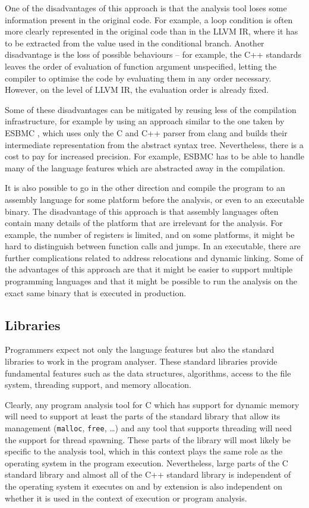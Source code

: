 One of the disadvantages of this approach is that the analysis tool loses some
information present in the original code.
For example, a loop condition is often more clearly represented in the original
code than in the LLVM IR, where it has to be extracted from the value used in
the conditional branch.
Another disadvantage is the loss of possible behaviours -- for example, the C++ standards leaves the order of evaluation of function argument unspecified, letting the compiler to optimise the code by evaluating them in any order necessary.
However, on the level of LLVM IR, the evaluation order is already fixed.

Some of these disadvantages can be mitigated by reusing less of the compilation
infrastructure, for example by using an approach similar to the one taken by
ESBMC , which uses only the C and C++ parser from clang and
builds their intermediate representation from the abstract syntax tree.
Nevertheless, there is a cost to pay for increased precision.
For example, ESBMC has to be able to handle many of the language features which are abstracted away in the compilation.

It is also possible to go in the other direction and compile the program to an assembly language for some platform before the analysis, or even to an executable binary.
The disadvantage of this approach is that assembly languages often contain many details of the platform that are irrelevant for the analysis.
For example, the number of registers is limited, and on some platforms, it might be hard to distinguish between function calls and jumps.
In an executable, there are further complications related to address relocations and dynamic linking.
Some of the advantages of this approach are that it might be easier to support multiple programming languages and that it might be possible to run the analysis on the exact same binary that is executed in production.

\subsection{Libraries}

Programmers expect not only the language features but also the standard
libraries to work in the program analyser.
These standard libraries provide fundamental features such as the data structures, algorithms, access to the file system, threading support, and memory allocation.

Clearly, any program analysis tool for C which has support for dynamic memory will need to support at least the parts of the standard library that allow its management (\texttt{malloc}, \texttt{free}, …) and any tool that supports threading will need the support for thread spawning.
These parts of the library will most likely be specific to the analysis tool,
which in this context plays the same role as the operating system in the
program execution.
Nevertheless, large parts of the C standard library and almost all of the C++
standard library is independent of the operating system it executes on and by
extension is also independent on whether it is used in the context of execution
or program analysis.

